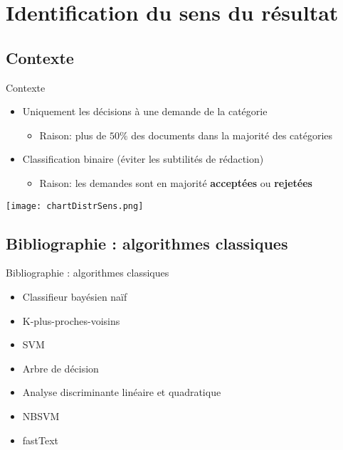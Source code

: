 \section{Identification du sens du résultat}
\subsection{Contexte}
\begin{frame}{Contexte}	
\begin{itemize}	\small
	\item Uniquement les décisions à une demande de la catégorie
	\begin{itemize}\scriptsize
		\item Raison: plus de $50\%$ des documents dans la majorité des catégories
	\end{itemize}
	\item Classification binaire (éviter les subtilités de rédaction)
	\begin{itemize} \scriptsize
		\item Raison: les demandes sont en majorité \textbf{acceptées} ou \textbf{rejetées}
	\end{itemize}
\end{itemize}
\centering \texttt{[image: chartDistrSens.png]}
\end{frame}

\subsection{Bibliographie : algorithmes classiques}

\begin{frame}{Bibliographie : algorithmes classiques}
	\begin{itemize}
		\item Classifieur bayésien naïf
		\item K-plus-proches-voisins
		\item SVM
		\item Arbre de décision
		\item Analyse discriminante linéaire et quadratique
		\item NBSVM \cite{wang2012nbsvm}
		\item fastText \cite{grave2017fasttextcls}		
	\end{itemize}
\end{frame}

